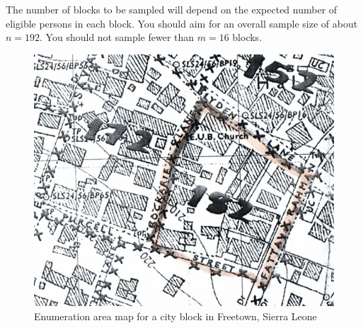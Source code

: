 \documentclass[12pt,a4paper]{book}
\theoremstyle{definition}
\theoremstyle{definition}
\theoremstyle{definition}
\theoremstyle{remark}
\begin{document}
The number of blocks to be sampled will depend on the expected number of
eligible persons in each block. You should aim for an overall sample
size of about \(n = 192\). You should not sample fewer than \(m = 16\)
blocks.

\begin{figure}[H]

{\centering \includegraphics{figures/stage2sample11} 

}

\caption{Enumeration area map for a city block in Freetown, Sierra Leone}\label{fig:sample25}
\end{figure}

\newpage
\end{document}
